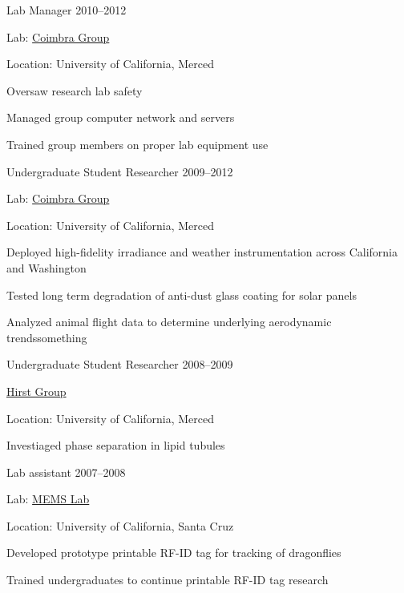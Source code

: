 \documentclass[11pt]{article}
\newcommand{\blankline}{\quad\pagebreak[3]}
\begin{document}
\blankline


Lab Manager \hfill 2010--2012
\begin{innerlist}
    \item Lab: \href{http://solarwind.ucsd.edu/}{Coimbra Group}
    \item Location: University of California, Merced
    \item Oversaw research lab safety
    \item Managed group computer network and servers
    \item Trained group members on proper lab equipment use
\end{innerlist}


\blankline


Undergraduate Student Researcher \hfill 2009--2012
\begin{innerlist}
    \item Lab: \href{http://solarwind.ucsd.edu/}{Coimbra Group}
    \item Location: University of California, Merced
    \item Deployed high-fidelity irradiance and weather instrumentation across California and Washington
    \item Tested long term degradation of anti-dust glass coating for solar panels
    \item Analyzed animal flight data to determine underlying aerodynamic trendssomething
\end{innerlist}


\blankline


Undergraduate Student Researcher \hfill 2008--2009 
\begin{innerlist}
    \item \href{http://faculty.ucmerced.edu/lhirst/}{Hirst Group}
    \item Location: University of California, Merced 
    \item Investiaged phase separation in lipid tubules
\end{innerlist}


\blankline


Lab assistant \hfill 2007--2008
\begin{innerlist}
    \item Lab: \href{http://mems.soe.ucsc.edu/}{MEMS Lab} 
    \item Location: University of California, Santa Cruz
    \item Developed prototype printable RF-ID tag for tracking of dragonflies
    \item Trained undergraduates to continue printable RF-ID tag research
\end{innerlist}
\end{document}
